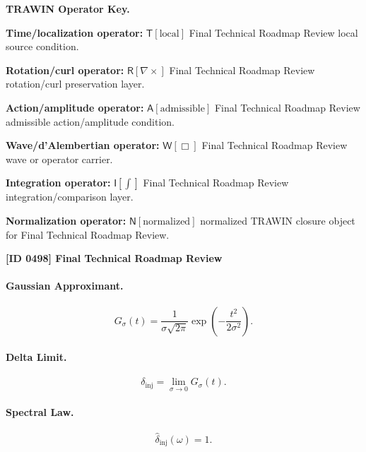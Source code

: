 \par\vspace{0.45\baselineskip}
\noindent\begin{minipage}[t]{\linewidth}
\begingroup
\small
\raggedright
\textbf{TRAWIN Operator Key.}\par
\noindent\textbf{Time/localization operator:} $\mathsf{T}\!\left[\mathrm{local}\right]$ Final Technical Roadmap Review local source condition.\par
\noindent\textbf{Rotation/curl operator:} $\mathsf{R}\!\left[\nabla\times\right]$ Final Technical Roadmap Review rotation/curl preservation layer.\par
\noindent\textbf{Action/amplitude operator:} $\mathsf{A}\!\left[\mathrm{admissible}\right]$ Final Technical Roadmap Review admissible action/amplitude condition.\par
\noindent\textbf{Wave/d'Alembertian operator:} $\mathsf{W}\!\left[\Box\right]$ Final Technical Roadmap Review wave or operator carrier.\par
\noindent\textbf{Integration operator:} $\mathsf{I}\!\left[\int\right]$ Final Technical Roadmap Review integration/comparison layer.\par
\noindent\textbf{Normalization operator:} $\mathsf{N}\!\left[\mathrm{normalized}\right]$ normalized TRAWIN closure object for Final Technical Roadmap Review.\par
\endgroup
\end{minipage}

\clearpage
\noindent\textbf{[ID 0498] Final Technical Roadmap Review}\par
\vspace{0.35em}
\paragraph{Gaussian Approximant.}
\begin{equation}
G_{\sigma}(t)
=
\frac{1}{\sigma\sqrt{2\pi}}
\exp\left(
-\frac{t^2}{2\sigma^2}
\right).
\end{equation}

\paragraph{Delta Limit.}
\begin{equation}
\delta_{\mathrm{inj}}
=
\lim_{\sigma\to0}G_{\sigma}(t).
\end{equation}

\paragraph{Spectral Law.}
\begin{equation}
\widehat{\delta}_{\mathrm{inj}}(\omega)=1.
\end{equation}

